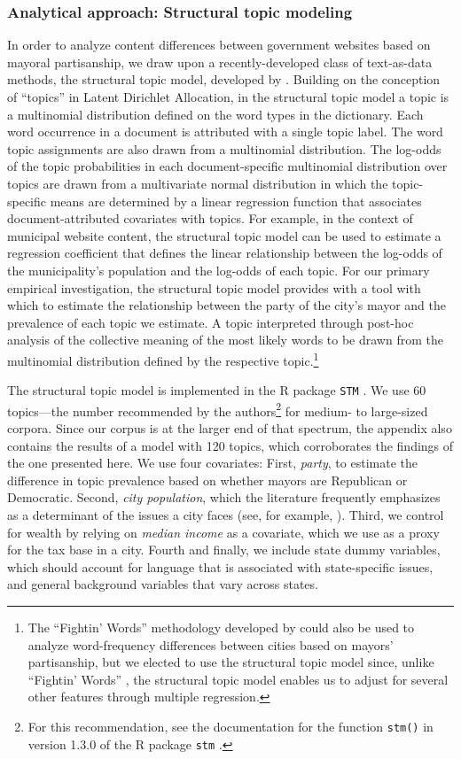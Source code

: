 \documentclass[11pt]{article}
\begin{document}
\subsubsection{Analytical approach: Structural topic modeling}
In order to analyze content differences between government websites based on mayoral partisanship, we draw upon a recently-developed class of text-as-data methods, the structural topic model, developed by \citet{Roberts2014}. Building on the conception of ``topics'' in Latent Dirichlet Allocation, in the structural topic model a topic is a multinomial distribution defined on the word types in the dictionary.  Each word occurrence in a document is attributed with a single topic label. The word topic assignments are also drawn from a multinomial distribution. The log-odds of the topic probabilities in each document-specific multinomial distribution over topics are drawn from a multivariate normal distribution in which the topic-specific means are determined by a linear regression function that associates document-attributed covariates with topics. For example, in the context of municipal website content, the structural topic model can be used to estimate a regression coefficient that defines the linear relationship between the log-odds of the municipality's population and the log-odds of each topic. For our primary empirical investigation, the structural topic model provides with a tool with which to estimate the relationship between the party of the city's mayor and the prevalence of each topic we estimate. A topic interpreted through post-hoc analysis of the collective meaning of the most likely words to be drawn from the multinomial distribution defined by the respective topic.\footnote{The ``Fightin' Words'' methodology developed by \citet{Monroe2008} could also be used to analyze word-frequency differences between cities based on mayors' partisanship, but we elected to use the structural topic model since, unlike ``Fightin' Words'' , the structural topic model enables us to adjust for several other features through multiple regression.}

The structural topic model is implemented in the R package \texttt{STM} \citep{stm}. We use 60 topics---the number recommended by the authors\footnote{For this recommendation, see the documentation for the function \texttt{stm()} in version 1.3.0 of the R package \texttt{stm} \citep{stm}.} for medium- to large-sized corpora. Since our corpus is at the larger end of that spectrum, the appendix also contains the results of a model with 120 topics, which corroborates the findings of the one presented here. We use four covariates: First, \textit{party}, to estimate the difference in topic prevalence based on whether mayors are Republican or Democratic. Second, \textit{city population}, which the literature frequently emphasizes as a determinant of the issues a city faces (see, for example, \cite{Guillamon2013}). Third, we control for wealth by relying on \textit{median income} as a covariate, which we use as a proxy for the tax base in a city. Fourth and finally, we include state dummy variables, which should account for language that is associated with state-specific issues, and general background variables that vary across states.
\end{document}
